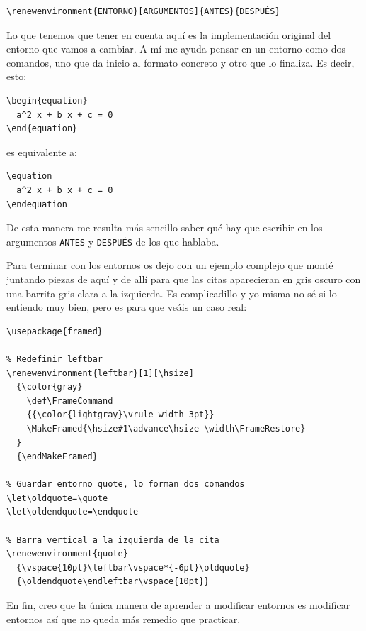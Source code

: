 \begin{lstlisting}[language={[latex]tex}]
\renewenvironment{ENTORNO}[ARGUMENTOS]{ANTES}{DESPUÉS}
\end{lstlisting}

Lo que tenemos que tener en cuenta aquí es la implementación original
del entorno que vamos a cambiar. A mí me ayuda pensar en un entorno como
dos comandos, uno que da inicio al formato concreto y otro que lo
finaliza. Es decir, esto:

\begin{lstlisting}[language={[latex]tex}]
\begin{equation}
  a^2 x + b x + c = 0
\end{equation}
\end{lstlisting}

es equivalente a:

\begin{lstlisting}[language={[latex]tex}]
\equation
  a^2 x + b x + c = 0
\endequation
\end{lstlisting}

De esta manera me resulta más sencillo saber qué hay que escribir en los
argumentos \lstinline!ANTES! y \lstinline!DESPUÉS! de los que hablaba.

Para terminar con los entornos os dejo con un ejemplo complejo que monté
juntando piezas de aquí y de allí para que las citas aparecieran en gris
oscuro con una barrita gris clara a la izquierda. Es complicadillo y yo
misma no sé si lo entiendo muy bien, pero es para que veáis un caso
real:

\begin{lstlisting}[language={[latex]tex}]
\usepackage{framed}

% Redefinir leftbar
\renewenvironment{leftbar}[1][\hsize]
  {\color{gray}
    \def\FrameCommand
    {{\color{lightgray}\vrule width 3pt}}
    \MakeFramed{\hsize#1\advance\hsize-\width\FrameRestore}
  }
  {\endMakeFramed}
  
% Guardar entorno quote, lo forman dos comandos
\let\oldquote=\quote
\let\oldendquote=\endquote

% Barra vertical a la izquierda de la cita
\renewenvironment{quote}
  {\vspace{10pt}\leftbar\vspace*{-6pt}\oldquote}
  {\oldendquote\endleftbar\vspace{10pt}}
\end{lstlisting}

En fin, creo que la única manera de aprender a modificar entornos es
modificar entornos así que no queda más remedio que practicar.

